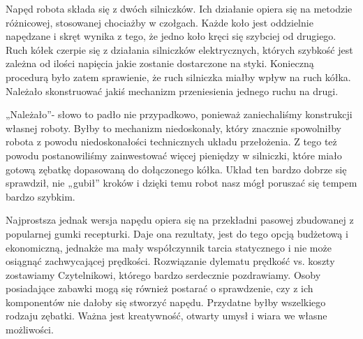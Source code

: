 Napęd robota składa się z dwóch silniczków. Ich działanie opiera się na metodzie różnicowej, stosowanej chociażby w czołgach. Każde koło jest oddzielnie napędzane i skręt wynika z tego, że jedno koło kręci się szybciej od drugiego. Ruch kółek czerpie się z działania silniczków elektrycznych, których szybkość jest zależna od ilości napięcia jakie zostanie dostarczone na styki. Konieczną procedurą było zatem sprawienie, że ruch silniczka miałby wpływ na ruch kółka. Należało skonstruować jakiś mechanizm przeniesienia jednego ruchu na drugi. 

„Należało”- słowo to padło nie przypadkowo, ponieważ zaniechaliśmy konstrukcji własnej roboty. Byłby to mechanizm niedoskonały, który znacznie spowolniłby robota z powodu niedoskonałości technicznych układu przełożenia. Z tego też powodu postanowiliśmy zainwestować więcej pieniędzy w silniczki, które miało gotową zębatkę dopasowaną do dołączonego kółka. Układ ten bardzo dobrze się sprawdził, nie „gubił” kroków i dzięki temu robot nasz mógł poruszać się tempem bardzo szybkim.

Najprostsza jednak wersja napędu opiera się na przekładni pasowej zbudowanej z popularnej gumki recepturki. Daje ona rezultaty, jest do tego opcją budżetową i ekonomiczną, jednakże ma mały współczynnik tarcia statycznego i nie może osiągnąć zachwycającej prędkości. Rozwiązanie dylematu prędkość vs. koszty zostawiamy Czytelnikowi, którego bardzo serdecznie pozdrawiamy. Osoby posiadające zabawki mogą się również postarać o sprawdzenie, czy z ich komponentów nie dałoby się stworzyć napędu. Przydatne byłby wszelkiego rodzaju zębatki. Ważna jest kreatywność, otwarty umysł i wiara we własne możliwości. 
